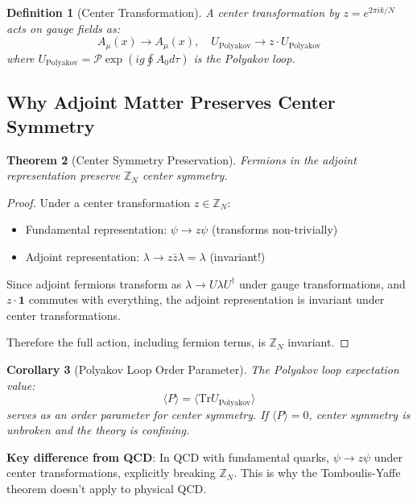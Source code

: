 \documentclass[12pt,a4paper]{article}
\newtheorem{theorem}{Theorem}[section]
\newtheorem{corollary}[theorem]{Corollary}
\newtheorem{definition}[theorem]{Definition}
\theoremstyle{remark}
\newcommand{\Tr}{\mathrm{Tr}}
\newcommand{\Z}{\mathbb{Z}}
\begin{document}
\begin{definition}[Center Transformation]
A center transformation by $z = e^{2\pi i k/N}$ acts on gauge fields as:
\[
A_\mu(x) \to A_\mu(x), \quad U_{\text{Polyakov}} \to z \cdot U_{\text{Polyakov}}
\]
where $U_{\text{Polyakov}} = \mathcal{P}\exp(ig\oint A_0 d\tau)$ is the Polyakov loop.
\end{definition}

\subsection{Why Adjoint Matter Preserves Center Symmetry}

\begin{theorem}[Center Symmetry Preservation]
\label{thm:center}
Fermions in the adjoint representation preserve $\Z_N$ center symmetry.
\end{theorem}

\begin{proof}
Under a center transformation $z \in \Z_N$:
\begin{itemize}
\item Fundamental representation: $\psi \to z \psi$ (transforms non-trivially)
\item Adjoint representation: $\lambda \to z \bar{z} \lambda = \lambda$ (invariant!)
\end{itemize}

Since adjoint fermions transform as $\lambda \to U\lambda U^\dagger$ under gauge 
transformations, and $z \cdot \mathbf{1}$ commutes with everything, the adjoint 
representation is invariant under center transformations.

Therefore the full action, including fermion terms, is $\Z_N$ invariant.
\end{proof}

\begin{corollary}[Polyakov Loop Order Parameter]
The Polyakov loop expectation value:
\[
\langle P \rangle = \langle \Tr U_{\text{Polyakov}} \rangle
\]
serves as an order parameter for center symmetry. If $\langle P \rangle = 0$, 
center symmetry is unbroken and the theory is confining.
\end{corollary}

\textbf{Key difference from QCD}: In QCD with fundamental quarks, 
$\psi \to z\psi$ under center transformations, explicitly breaking $\Z_N$. 
This is why the Tomboulis-Yaffe theorem doesn't apply to physical QCD.

\end{document}
